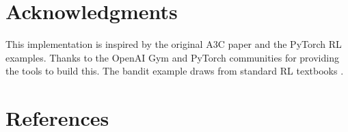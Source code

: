 \documentclass[11pt]{article}
\begin{document}
\section{Acknowledgments}
This implementation is inspired by the original A3C paper \cite{mnih2016asynchronous} and the PyTorch RL examples. Thanks to the OpenAI Gym and PyTorch communities for providing the tools to build this. The bandit example draws from standard RL textbooks \cite{sutton2018reinforcement}.

\section*{References}


\end{document}
